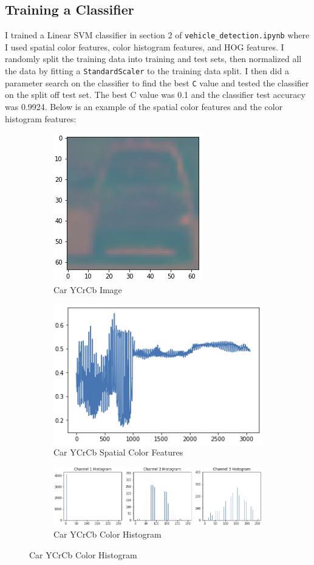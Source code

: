 \documentclass[12pt]{article}
\begin{document}
\subsection{Training a Classifier}
I trained a Linear SVM classifier in section 2 of \texttt{vehicle\_detection.ipynb} where I used spatial color features, color histogram features, and HOG features. I randomly split the training data into training and test sets, then normalized all the data by fitting a \texttt{StandardScaler} to the training data split. I then did a parameter search on the classifier to find the best \texttt{C} value and tested the classifier on the split off test set. The best C value was 0.1 and the classifier test accuracy was 0.9924. Below is an example of the spatial color features and the color histogram features:
\begin{figure}[!h]
\centering
\begin{subfigure}{0.495\textwidth}
\centering
\includegraphics[scale=0.5]{car_ycrcb.png}
\caption{Car YCrCb Image}
\end{subfigure}
\begin{subfigure}{0.495\textwidth}
\centering
\includegraphics[scale=0.5]{car_spatial.png}
\caption{Car YCrCb Spatial Color Features}
\end{subfigure}
\begin{subfigure}{0.99\textwidth}
\centering
\includegraphics[scale=0.6]{car_color_hist.png}
\caption{Car YCrCb Color Histogram}
\end{subfigure}
\end{figure}
\end{document}
